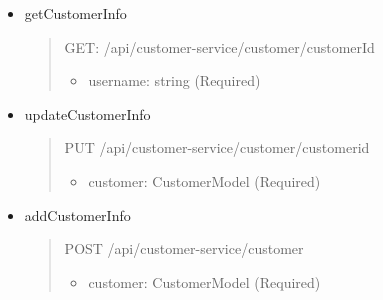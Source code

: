 \begin{itemize}
	\item getCustomerInfo
	      \begin{quote}
		      GET: /api/customer-service/customer/{customerId}
		      \begin{itemize}
			      \item username: string (Required)
		      \end{itemize}
	      \end{quote}

	\item updateCustomerInfo
	      \begin{quote}
		      PUT /api/customer-service/customer/{customerid}
		      \begin{itemize}
			      \item customer: CustomerModel (Required)
		      \end{itemize}
	      \end{quote}

	\item addCustomerInfo
	      \begin{quote}
		      POST /api/customer-service/customer
		      \begin{itemize}
			      \item customer: CustomerModel (Required)
		      \end{itemize}
	      \end{quote}
\end{itemize}

